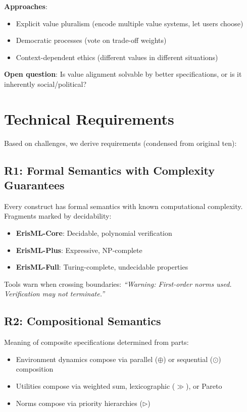 \documentclass[conference]{IEEEtran}
\begin{document}
\textbf{Approaches}:
\begin{itemize}
\item Explicit value pluralism (encode multiple value systems, let users choose)
\item Democratic processes (vote on trade-off weights)
\item Context-dependent ethics (different values in different situations)
\end{itemize}

\textbf{Open question}: Is value alignment solvable by better
specifications, or is it inherently social/political?

\section{Technical Requirements}
\label{sec:requirements}

Based on challenges, we derive requirements (condensed from original ten):

\subsection{R1: Formal Semantics with Complexity Guarantees}

Every construct has formal semantics with known computational
complexity. Fragments marked by decidability:
\begin{itemize}
\item \textbf{ErisML-Core}: Decidable, polynomial verification
\item \textbf{ErisML-Plus}: Expressive, NP-complete
\item \textbf{ErisML-Full}: Turing-complete, undecidable properties
\end{itemize}

Tools warn when crossing boundaries: \emph{``Warning: First-order norms
used. Verification may not terminate.''}

\subsection{R2: Compositional Semantics}

Meaning of composite specifications determined from parts:
\begin{itemize}
\item Environment dynamics compose via parallel ($\oplus$) or sequential ($\odot$) composition
\item Utilities compose via weighted sum, lexicographic ($\gg$), or Pareto
\item Norms compose via priority hierarchies ($\rhd$)
\end{itemize}
\end{document}
